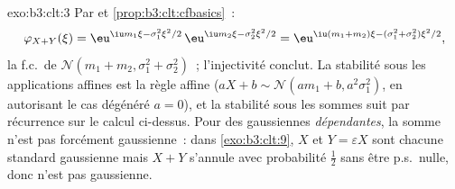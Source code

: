 \begin{solution}{exo:b3:clt:3}
Par  et \cref{prop:b3:clt:cfbasics}~:
\[
\varphi_{X+Y}(\xi) = \eu^{\iu m_1\xi - \sigma_1^2\xi^2/2}\,
\eu^{\iu m_2\xi - \sigma_2^2\xi^2/2}
= \eu^{\iu(m_1+m_2)\xi - (\sigma_1^2+\sigma_2^2)\xi^2/2},
\]
la f.c.\ de $\mathcal N(m_1 + m_2, \sigma_1^2 + \sigma_2^2)$~;
l'injectivité conclut. La stabilité sous les applications
affines est la règle affine ($aX + b \sim \mathcal N(am_1 + b,
a^2\sigma_1^2)$, en autorisant le cas dégénéré $a = 0$), et
la stabilité sous les sommes  suit par
récurrence sur le calcul ci-dessus. Pour des gaussiennes
\emph{dépendantes}, la somme n'est pas forcément
gaussienne~: dans \cref{exo:b3:clt:9}, $X$ et $Y =
\varepsilon X$ sont chacune standard gaussienne mais $X + Y$
s'annule avec probabilité $\frac12$ sans être p.s.\ nulle,
donc n'est pas gaussienne.
\end{solution}

